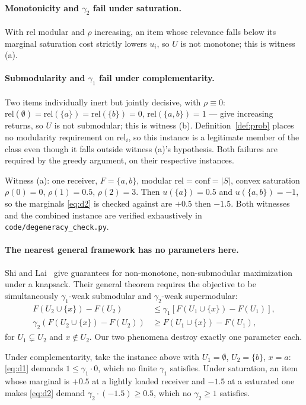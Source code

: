 \documentclass[sigconf,anonymous]{aamas}
\theoremstyle{remark}
\begin{document}
\paragraph{Monotonicity and $\gamma_2$ fail under saturation.} With
$\mathrm{rel}$ modular and $\rho$ increasing, an item whose relevance
falls below its marginal saturation cost strictly lowers $u_i$, so $U$
is not monotone; this is witness (a).

\paragraph{Submodularity and $\gamma_1$ fail under complementarity.}
Two items individually inert but jointly decisive, with $\rho\equiv0$:
$\mathrm{rel}(\emptyset)=\mathrm{rel}(\{a\})=\mathrm{rel}(\{b\})=0$,
$\mathrm{rel}(\{a,b\})=1$ --- give increasing returns, so $U$ is not
submodular; this is witness (b). Definition~\ref{def:prob} places no
modularity requirement on $\mathrm{rel}_i$, so this instance is a
legitimate member of the class even though it falls outside witness
(a)'s hypothesis. Both failures are required by the greedy argument,
on their respective instances.

Witness (a): one receiver, $F=\{a,b\}$, modular
$\mathrm{rel}{=}\mathrm{conf}{=}|S|$, convex saturation
$\rho(0){=}0$, $\rho(1){=}0.5$, $\rho(2){=}3$. Then $u(\{a\})=0.5$ and
$u(\{a,b\})=-1$, so the marginals \eqref{eq:d2} is checked against are
$+0.5$ then $-1.5$. Both witnesses and the combined instance are
verified exhaustively in \texttt{code/degeneracy\_check.py}.

\paragraph{The nearest general framework has no parameters here.}
Shi and Lai~\cite{shilai2024} give guarantees for non-monotone,
non-submodular maximization under a knapsack. Their general theorem
requires the objective to be simultaneously $\gamma_1$-weak submodular
and $\gamma_2$-weak supermodular:
\begin{align}
F(U_2 \cup \{x\}) - F(U_2) &\le \gamma_1\left[F(U_1 \cup \{x\}) - F(U_1)\right],
\label{eq:d1}\\
\gamma_2\left(F(U_2 \cup \{x\}) - F(U_2)\right) &\ge F(U_1 \cup \{x\}) - F(U_1),
\label{eq:d2}
\end{align}
for $U_1 \subsetneq U_2$ and $x \notin U_2$. Our two phenomena destroy
exactly one parameter each.

Under complementarity, take the instance above with $U_1 = \emptyset$,
$U_2 = \{b\}$, $x = a$: \eqref{eq:d1} demands $1 \le \gamma_1 \cdot 0$,
which no finite $\gamma_1$ satisfies. Under saturation, an item whose
marginal is $+0.5$ at a lightly loaded receiver and $-1.5$ at a
saturated one makes \eqref{eq:d2} demand
$\gamma_2 \cdot (-1.5) \ge 0.5$, which no $\gamma_2 \ge 1$ satisfies.
\end{document}
